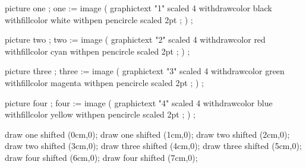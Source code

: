 
\startMPpage
	picture one   ; one   := image ( graphictext "1" scaled 4
        withdrawcolor black withfillcolor white
        withpen pencircle scaled 2pt ; ) ;

	picture two   ; two   := image ( graphictext "2" scaled 4
        withdrawcolor red   withfillcolor cyan
        withpen pencircle scaled 2pt ; ) ;

	picture three ; three := image ( graphictext "3" scaled 4
        withdrawcolor green withfillcolor magenta
        withpen pencircle scaled 2pt ; ) ;

	picture four  ; four  := image ( graphictext "4" scaled 4
        withdrawcolor blue  withfillcolor yellow
        withpen pencircle scaled 2pt ; ) ;

	draw one   shifted (0cm,0);
	draw one   shifted (1cm,0);
	draw two   shifted (2cm,0);
	draw two   shifted (3cm,0);
	draw three shifted (4cm,0);
	draw three shifted (5cm,0);
	draw four  shifted (6cm,0); %
	draw four  shifted (7cm,0); %
\stopMPpage
